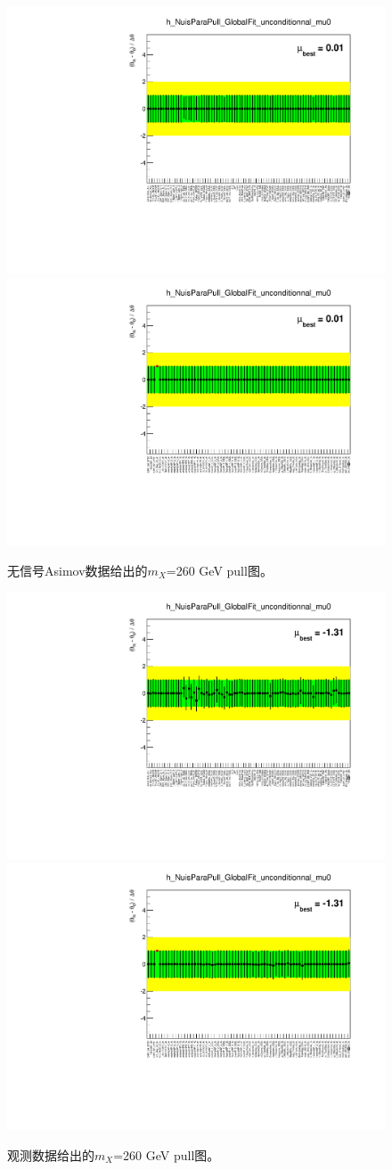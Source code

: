 \begin{figure}
\centering
\includegraphics[width=.35\textwidth, angle=-90]{fig/Statistical/combination/pull-exp-combined-mH260_1.pdf}
\includegraphics[width=.35\textwidth, angle=-90]{fig/Statistical/combination/pull-exp-combined-mH260_2.pdf}
\caption{无信号Asimov数据给出的$m_X$=260 GeV pull图。}
\label{fig:pull-exp-comb-260}
\end{figure}


\begin{figure}
\centering
\includegraphics[width=.35\textwidth, angle=-90]{fig/Statistical/combination/pull-obs-combined-mH260_1.pdf}
\includegraphics[width=.35\textwidth, angle=-90]{fig/Statistical/combination/pull-obs-combined-mH260_2.pdf}
\caption{观测数据给出的$m_X$=260 GeV pull图。}
\label{fig:pull-obs-comb-260}
\end{figure}

